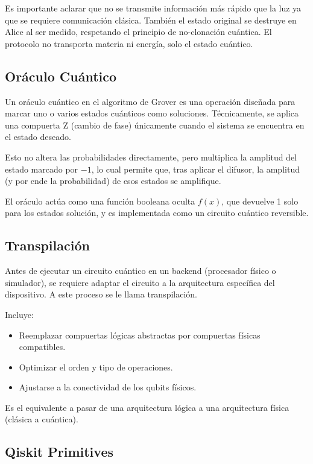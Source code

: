 \documentclass{article}
\begin{document}
Es importante aclarar que no se transmite información más rápido que la luz ya que se requiere 
comunicación clásica. También el estado original se destruye en Alice al ser medido, respetando 
el principio de no-clonación cuántica. El protocolo 
no transporta materia ni energía, solo el estado cuántico.

\subsection*{Oráculo Cuántico}

Un oráculo cuántico en el algoritmo de Grover es una operación diseñada 
para marcar uno o varios estados cuánticos como soluciones. Técnicamente, se aplica una 
compuerta Z (cambio de fase) únicamente cuando el sistema se encuentra en el estado deseado.

Esto no altera las probabilidades directamente, pero 
multiplica la amplitud del estado marcado por $-1$, lo cual permite que, tras aplicar 
el difusor, la amplitud (y por ende la probabilidad) de esos estados se amplifique.

El oráculo actúa como una función booleana oculta $f(x)$, que devuelve 1 solo para 
los estados solución, y es implementada como un circuito cuántico reversible.

\subsection*{Transpilación}

Antes de ejecutar un circuito cuántico en un backend (procesador físico o simulador), 
se requiere adaptar el circuito a la arquitectura específica del dispositivo. 
A este proceso se le llama transpilación.

Incluye:
\begin{itemize}
    \item Reemplazar compuertas lógicas abstractas por compuertas físicas compatibles.
    \item Optimizar el orden y tipo de operaciones.
    \item Ajustarse a la conectividad de los qubits físicos.
\end{itemize}

Es el equivalente a pasar de una arquitectura lógica a una arquitectura física 
(clásica a cuántica).

\subsection*{Qiskit Primitives}
\end{document}
